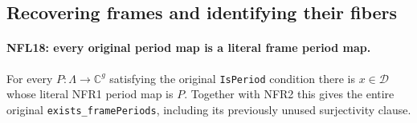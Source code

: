 \documentclass[11pt,a4paper]{article}
\numberwithin{equation}{section}
\theoremstyle{remark}\newtheorem{remark}[theorem]{Remark}
\begin{document}
\subsection{Recovering frames and identifying their fibers}

\paragraph{NFL18: every original period map is a literal frame period map.}
\label{claim:NFL18}
For every $P:\Lambda\to\mathbb C^g$ satisfying the original
\texttt{Is\allowbreak Period} condition there is $x\in\mathcal D$ whose
literal NFR1 period map is $P$.  Together with NFR2 this gives
the entire original \texttt{exists\_\allowbreak frame\allowbreak Periods}, including
its previously unused surjectivity clause.
\end{document}
